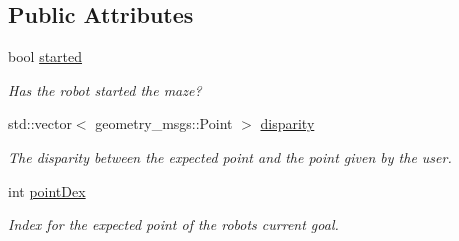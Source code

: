 \subsection*{Public Attributes}
\begin{DoxyCompactItemize}
\item 
\hypertarget{classRobot_ae9a66d09c570678d40cf1dbc71d240c3}{bool \hyperlink{classRobot_ae9a66d09c570678d40cf1dbc71d240c3}{started}}\label{classRobot_ae9a66d09c570678d40cf1dbc71d240c3}

\begin{DoxyCompactList}\small\item\em Has the robot started the maze? \end{DoxyCompactList}\item 
\hypertarget{classRobot_a69fbe806fa3031514fdf7add365ede0f}{std\-::vector$<$ geometry\-\_\-msgs\-::\-Point $>$ \hyperlink{classRobot_a69fbe806fa3031514fdf7add365ede0f}{disparity}}\label{classRobot_a69fbe806fa3031514fdf7add365ede0f}

\begin{DoxyCompactList}\small\item\em The disparity between the expected point and the point given by the user. \end{DoxyCompactList}\item 
\hypertarget{classRobot_a61982faaa0db91a08195786b552f9732}{int \hyperlink{classRobot_a61982faaa0db91a08195786b552f9732}{point\-Dex}}\label{classRobot_a61982faaa0db91a08195786b552f9732}

\begin{DoxyCompactList}\small\item\em Index for the expected point of the robots current goal. \end{DoxyCompactList}\end{DoxyCompactItemize}
